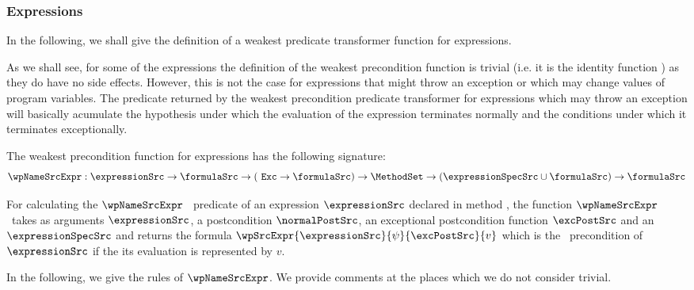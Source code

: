\subsubsection{Expressions}\label{pog:wpSrc:wpExpr}
In the following, we shall give the definition of a weakest
predicate transformer function for expressions. 


As we shall see,  for some of the expressions   
the definition of the weakest precondition function is trivial (i.e. it is the identity function )
 as they do have  no side effects.
 However, this is not the case for expressions that might throw an exception or which may change values of program variables.
 The predicate returned by the weakest precondition predicate transformer for expressions which may throw an exception 
will basically acumulate the hypothesis under which the evaluation 
of the expression terminates normally and the  conditions under which it  terminates exceptionally.


The weakest precondition function for expressions has the following signature:
$$ \wpNameSrcExpr : \expressionSrc \rightarrow \formulaSrc \rightarrow ( \mbox{ \rm \texttt{Exc}} \rightarrow  \formulaSrc ) \rightarrow  
\MethodSet \rightarrow   (\expressionSpecSrc \cup \formulaSrc)  \rightarrow  \formulaSrc $$

For calculating the  $\wpNameSrcExpr$  \ predicate  of  an expression $\expressionSrc$ declared in method \methodd,
 the function $\wpNameSrcExpr$ \ takes as arguments  $\expressionSrc$, a postcondition $\normalPostSrc$, an exceptional postcondition 
function $\excPostSrc$  and  an $\expressionSpecSrc$ and returns the    formula 
$\wpSrcExpr{\expressionSrc}{\psi}{\excPostSrc}{ v }$ which is the \wpName \ precondition of $\expressionSrc$ 
if the its evaluation is represented by $v$.

In the following, we give the rules of $\wpNameSrcExpr$.
We provide comments at the places which we do not consider trivial.


